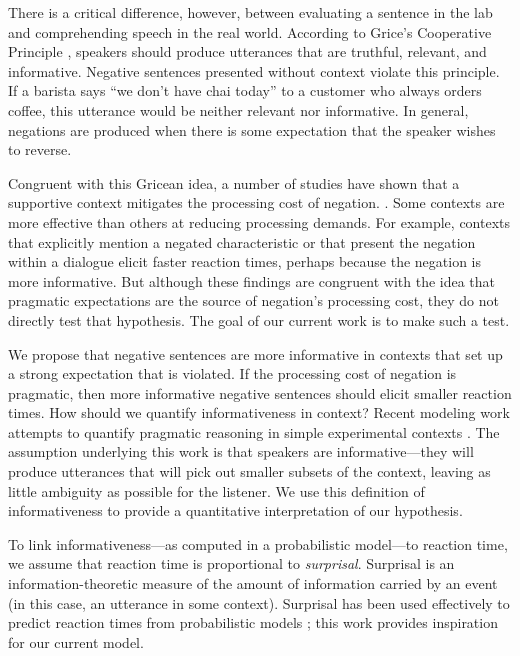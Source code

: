 \documentclass[10pt,letterpaper]{article}
\begin{document}
There is a critical difference, however, between evaluating a sentence in the lab and comprehending speech in the real world. According to Grice's Cooperative Principle \cite{grice1975}, speakers should produce utterances that are truthful, relevant, and informative.  Negative sentences presented without context violate this principle.  If a barista says ``we don't have chai today'' to a customer who always orders coffee, this utterance would be neither relevant nor informative.  In general, negations are produced when there is some expectation that the speaker wishes to reverse.  

Congruent with this Gricean idea, a number of studies have shown that a supportive context mitigates the processing cost of negation.  \cite{wason1965, glenberg1999, ludtke2006, nieuwland2008, dale2011}. Some contexts are more effective than others at reducing processing demands. For example, contexts that explicitly mention a negated characteristic \cite{ludtke2006} or that present the negation within a dialogue \cite{dale2011} elicit faster reaction times, perhaps because the negation is more informative. But although these findings are congruent with the idea that pragmatic expectations are the source of negation's processing cost, they do not directly test that hypothesis.  The goal of our current work is to make such a test.

We propose that negative sentences are more informative in contexts that set up a strong expectation that is violated. If the processing cost of negation is pragmatic, then more informative negative sentences should elicit smaller reaction times. How should we quantify informativeness in context? Recent modeling work attempts to quantify pragmatic reasoning in simple experimental contexts \cite{frank2012,goodman2013}. The assumption underlying this work is that speakers are informative---they will produce utterances that will pick out smaller subsets of the context, leaving as little ambiguity as possible for the listener.  We use this definition of informativeness to provide a quantitative interpretation of our hypothesis.

To link informativeness---as computed in a probabilistic model---to reaction time, we assume that reaction time is proportional to \emph{surprisal}. Surprisal is an information-theoretic measure of the amount of information carried by an event (in this case, an utterance in some context). Surprisal has been used effectively to predict reaction times from probabilistic models \cite{levy2008}; this work provides inspiration for our current model. 
\end{document}
